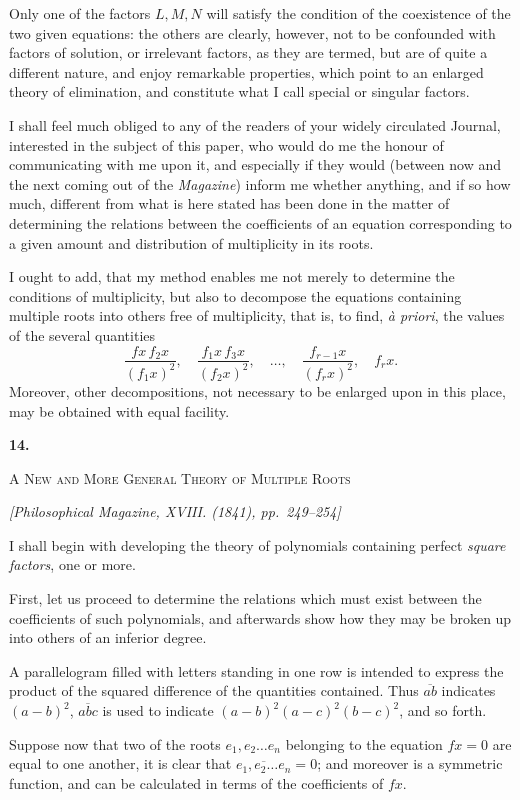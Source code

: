 \documentclass[11pt]{article}
\newcommand{\paperhead}[3]{%
  \clearpage
  \begin{center}
  {\Large\bfseries #1.}\par\vspace{0.85em}
  {\large\scshape #2}\par\vspace{0.6em}
  {\itshape [#3]}\par
  \end{center}\vspace{0.4em}}
\newcommand{\sourcepage}[1]{\marginpar{\scriptsize p.~#1}}
\newcommand{\pgram}[1]{\overline{#1}}
\begin{document}
Only one of the factors $L,M,N$ will satisfy the condition of the coexistence of the two given equations: the others are clearly, however, not to be confounded with factors of solution, or irrelevant factors, as they are termed, but are of quite a different nature, and enjoy remarkable properties, which point to an enlarged theory of elimination, and constitute what I call special or singular factors.

I shall feel much obliged to any of the readers of your widely circulated Journal, interested in the subject of this paper, who would do me the honour of communicating with me upon it, and especially if they would (between now and the next coming out of the \emph{Magazine}) inform me whether anything, and if so how much, different from what is here stated has been done in the matter of determining the relations between the coefficients of an equation corresponding to a given amount and distribution of multiplicity in its roots.

I ought to add, that my method enables me not merely to determine the conditions of multiplicity, but also to decompose the equations containing multiple roots into others free of multiplicity, that is, to find, \emph{\`a priori}, the values of the several quantities
\[
 \frac{fx\,f_2x}{(f_1x)^2},\quad
 \frac{f_1x\,f_3x}{(f_2x)^2},\quad \ldots,\quad
 \frac{f_{r-1}x}{(f_rx)^2},\quad f_rx.
\]
Moreover, other decompositions, not necessary to be enlarged upon in this place, may be obtained with equal facility.

\paperhead{14}{A New and More General Theory of Multiple Roots}{Philosophical Magazine, XVIII. (1841), pp.~249--254}

\sourcepage{69}
I shall begin with developing the theory of polynomials containing perfect \emph{square factors}, one or more.

First, let us proceed to determine the relations which must exist between the coefficients of such polynomials, and afterwards show how they may be broken up into others of an inferior degree.

A parallelogram filled with letters standing in one row is intended to express the product of the squared difference of the quantities contained. Thus $\pgram{ab}$ indicates $(a-b)^2$, $\pgram{abc}$ is used to indicate $(a-b)^2(a-c)^2(b-c)^2$, and so forth.

Suppose now that two of the roots $e_1,e_2\ldots e_n$ belonging to the equation $fx=0$ are equal to one another, it is clear that $\pgram{e_1,e_2\ldots e_n}=0$; and moreover is a symmetric function, and can be calculated in terms of the coefficients of $fx$.
\end{document}

